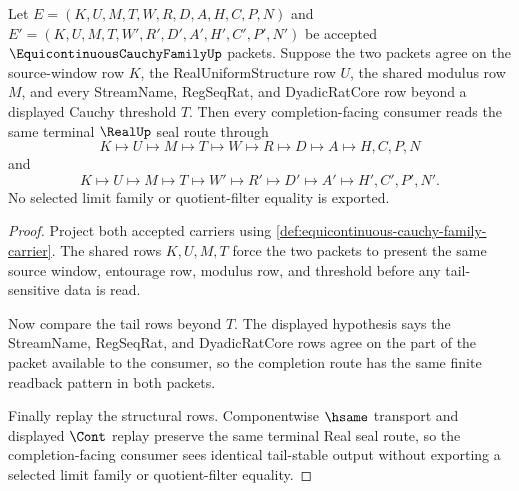 \begin{theorem}
\label{thm:equicontinuous-cauchy-family-tail-stability}
Let $E=(K,U,M,T,W,R,D,A,H,C,P,N)$ and $E'=(K,U,M,T,W',R',D',A',H',C',P',N')$ be accepted $\EquicontinuousCauchyFamilyUp$ packets. Suppose the two packets agree on the source-window row $K$, the RealUniformStructure row $U$, the shared modulus row $M$, and every StreamName, RegSeqRat, and DyadicRatCore row beyond a displayed Cauchy threshold $T$. Then every completion-facing consumer reads the same terminal $\RealUp$ seal route through
$$
K \longmapsto U \longmapsto M \longmapsto T \longmapsto W \longmapsto R \longmapsto D \longmapsto A \longmapsto H,C,P,N
$$
and
$$
K \longmapsto U \longmapsto M \longmapsto T \longmapsto W' \longmapsto R' \longmapsto D' \longmapsto A' \longmapsto H',C',P',N' .
$$
No selected limit family or quotient-filter equality is exported.
\end{theorem}
\begin{proof}
Project both accepted carriers using \autoref{def:equicontinuous-cauchy-family-carrier}. The shared rows $K,U,M,T$ force the two packets to present the same source window, entourage row, modulus row, and threshold before any tail-sensitive data is read.

Now compare the tail rows beyond $T$. The displayed hypothesis says the StreamName, RegSeqRat, and DyadicRatCore rows agree on the part of the packet available to the consumer, so the completion route has the same finite readback pattern in both packets.

Finally replay the structural rows. Componentwise $\hsame$ transport and displayed $\Cont$ replay preserve the same terminal Real seal route, so the completion-facing consumer sees identical tail-stable output without exporting a selected limit family or quotient-filter equality.
\end{proof}

